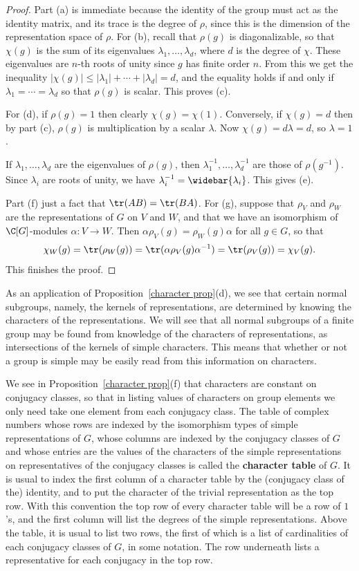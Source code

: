 \begin{proof}
Part (a) is immediate because the identity of the group must act as the identity matrix, and its trace is the degree of $\rho$, since this is the dimension of the representation space of $\rho$. For (b), recall that $\rho(g)$ is diagonalizable, so that $\chi(g)$ is the sum of its eigenvalues $\lambda_1,\dots,\lambda_d$, where $d$ is the degree of $\chi$. These eigenvalues are $n$-th roots of unity since $g$ has finite order $n$. From this we get the inequality $|\chi(g)|\leq|\lambda_1|+\cdots+|\lambda_d|=d$, and the equality holds if and only if $\lambda_1=\cdots=\lambda_d$ so that $\rho(g)$ is scalar. This proves (c).\par
For (d), if $\rho(g)=1$ then clearly $\chi(g)=\chi(1)$. Conversely, if $\chi(g)=d$ then by part (c), $\rho(g)$ is multiplication by a scalar $\lambda$. Now $\chi(g)=d\lambda=d$, so $\lambda=1$.\par
If $\lambda_1,\dots,\lambda_d$ are the eigenvalues of $\rho(g)$, then $\lambda_1^{-1},\dots,\lambda_d^{-1}$ are those of $\rho(g^{-1})$. Since $\lambda_i$ are roots of unity, we have $\lambda_i^{-1}=\widebar{\lambda_i}$. This gives (e).\par
Part (f) just a fact that $\tr(AB)=\tr(BA)$. For (g), suppose that $\rho_V$ and $\rho_W$ are the representations of $G$ on $V$ and $W$, and that we have an isomorphism of $\C[G]$-modules $\alpha:V\to W$. Then $\alpha\rho_V(g)=\rho_W(g)\alpha$ for all $g\in G$, so that
\[\chi_W(g)=\tr(\rho_W(g))=\tr(\alpha\rho_V(g)\alpha^{-1})=\tr(\rho_V(g))=\chi_V(g).\]
This finishes the proof.
\end{proof}
As an application of Proposition~\ref{character prop}(d), we see that certain normal subgroups, namely, the kernels of representations, are determined by knowing the characters of the representations. We will see that all normal subgroups of a finite group may be found from knowledge of the characters of representations, as intersections of the kernels of simple characters. This means that whether or not a group is simple may be easily read from this information on characters.\par
We see in Proposition~\ref{character prop}(f) that characters are constant on conjugacy classes, so that in listing values of characters on group elements we only need take one element from each conjugacy class. The table of complex numbers whose rows are indexed by the isomorphism types of simple representations of $G$, whose columns are indexed by the conjugacy classes of $G$ and whose entries are the values of the characters of the simple representations on representatives of the conjugacy classes is called the \textbf{character table} of $G$. It is usual to index the first column of a character table by the (conjugacy class of the) identity, and to put the character of the trivial representation as the top row. With this convention the top row of every character table will be a row of $1$'s, and the first column will list the degrees of the simple representations. Above the table, it is usual to list two rows, the first of which is a list of cardinalities of each conjugacy classes of $G$, in some notation. The row underneath lists a representative for each conjugacy in the top row.

